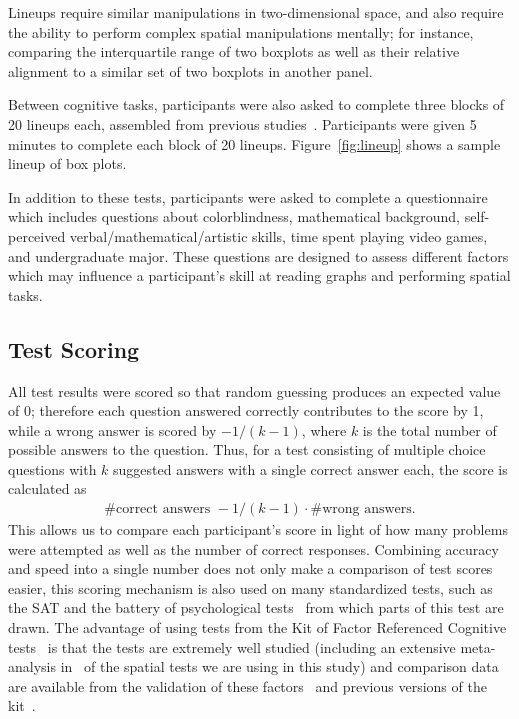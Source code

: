 \documentclass[journal]{vgtc}\usepackage[]{graphicx}\usepackage[]{color}
\begin{document}
Lineups require similar manipulations in two-dimensional space, and also require the ability to perform complex spatial manipulations mentally; for instance, comparing the interquartile range of two boxplots as well as their relative alignment to a similar set of two boxplots in another panel.

Between cognitive tasks, participants were also asked to complete three blocks of 20 lineups each, assembled from previous studies~\cite{hofmann2012graphical,majumder2013validation}. Participants were given 5 minutes to complete each block of 20 lineups. Figure~\ref{fig:lineup} shows a sample lineup of box plots. 

In addition to these tests, participants were asked to complete a questionnaire which includes questions about colorblindness, mathematical background, self-perceived verbal/mathematical/artistic skills, time spent playing video games, and undergraduate major. 
These questions are designed to assess different factors which may influence a participant's skill at reading graphs and performing spatial tasks. 

\subsection{Test Scoring}\label{sec:scaling}

All test results were scored so that random guessing produces an expected value of 0; therefore each question answered correctly contributes to the score by 1, while a wrong answer is scored by $-1/(k-1)$, where $k$ is the total number of possible answers to the question. Thus, for a test consisting of multiple choice questions with $k$ suggested answers with a single correct answer each, the score is calculated as
\begin{eqnarray}\label{eq.scoring}
\# \text{correct answers } - 1/(k-1) \cdot \# \text{wrong answers}.
\end{eqnarray}
This allows us to compare each participant's score in light of how many problems were attempted as well as the number of correct responses. Combining accuracy and speed into a single number does not only make a comparison of test scores easier,  this scoring mechanism is also used on many standardized tests, such as the SAT and the battery of psychological tests~\cite{diamond1973correction, ekstrom1976manual} from which parts of this test are drawn. The advantage of using tests from the Kit of Factor Referenced Cognitive tests~\cite{ekstrom1976manual} is that the tests are extremely well studied (including an extensive meta-analysis in~\cite{voyer1995magnitude} of the spatial tests we are using in this study) and comparison data are available from the validation of these factors~\cite{schaie1998longitudinal,hampson1990variations,mayer1994whom} and previous versions of the kit~\cite{educational1963kit}.
\end{document}
